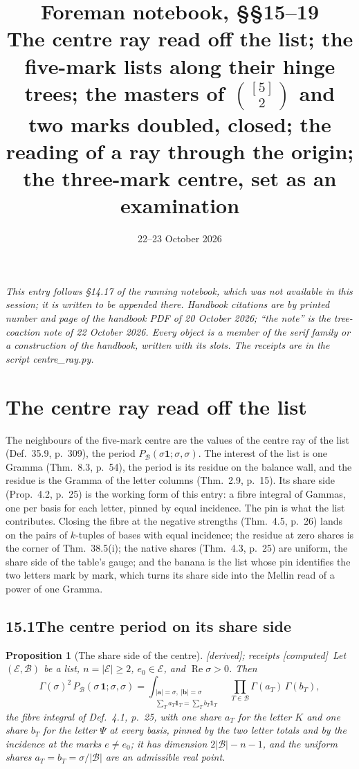 \documentclass[11pt]{article}
\title{Foreman notebook, \S\S15--19\\[4pt]\large The centre ray read off the list; the five-mark lists along their hinge trees; the masters of $\binom{[5]}2$ and two marks doubled, closed; the reading of a ray through the origin; the three-mark centre, set as an examination}
\date{22--23 October 2026}
\author{}
\newcommand{\cE}{\mathcal E}
\newcommand{\cB}{\mathcal B}
\newcommand{\one}{\mathbf 1}
\DeclareMathOperator{\re}{Re}
\newcommand{\Pc}[1]{P_{\cB}(#1\,\one;#1,#1)}
\theoremstyle{plain}
\newtheorem{proposition}{Proposition}[section]
\theoremstyle{definition}
\theoremstyle{remark}
\newcommand{\derived}{\textup{[derived]}}
\newcommand{\computed}{\textup{[computed]}}
\begin{document}
\maketitle

\noindent\emph{This entry follows \S14.17 of the running notebook, which was not available in this session; it is written to be appended there. Handbook citations are by printed number and page of the handbook PDF of 20 October 2026; ``the note'' is the tree-coaction note of 22 October 2026. Every object is a member of the serif family or a construction of the handbook, written with its slots. The receipts are in the script centre\_ray.py.}

\section{The centre ray read off the list}

The neighbours of the five-mark centre are the values of the centre ray of the list (Def.~35.9, p.~309), the period $P_{\cB}(\sigma\one;\sigma,\sigma)$. The interest of the list is one Gramma (Thm.~8.3, p.~54), the period is its residue on the balance wall, and the residue is the Gramma of the letter columns (Thm.~2.9, p.~15). Its share side (Prop.~4.2, p.~25) is the working form of this entry: a fibre integral of Gammas, one per basis for each letter, pinned by equal incidence. The pin is what the list contributes. Closing the fibre at the negative strengths (Thm.~4.5, p.~26) lands on the pairs of $k$-tuples of bases with equal incidence; the residue at zero shares is the corner of Thm.~38.5(i); the native shares (Thm.~4.3, p.~25) are uniform, the share side of the table's gauge; and the banana is the list whose pin identifies the two letters mark by mark, which turns its share side into the Mellin read of a power of one Gramma.

\subsection*{15.1\quad The centre period on its share side}

\begin{proposition}[The share side of the centre]\label{p:share}\derived; receipts \computed\
Let $(\cE,\cB)$ be a list, $n=|\cE|\ge2$, $e_0\in\cE$, and $\re\sigma>0$. Then
\[
\Gamma(\sigma)^2\,\Pc\sigma=\int_{\substack{|\mathbf a|=\sigma,\ |\mathbf b|=\sigma\\ \sum_Ta_T\one_T=\sum_Tb_T\one_T}}\ \prod_{T\in\cB}\Gamma(a_T)\,\Gamma(b_T),
\]
the fibre integral of Def.~4.1, p.~25, with one share $a_T$ for the letter $K$ and one share $b_T$ for the letter $\Psi$ at every basis, pinned by the two letter totals and by the incidence at the marks $e\neq e_0$; it has dimension $2|\cB|-n-1$, and the uniform shares $a_T=b_T=\sigma/|\cB|$ are an admissible real point.
\end{proposition}
\end{document}
